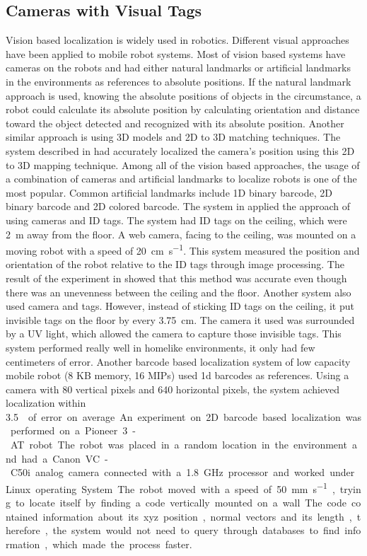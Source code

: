 \documentclass{article}
\begin{document}
  \subsection{Cameras with Visual Tags}
		Vision based localization is widely used in robotics. Different visual approaches have been applied to mobile robot systems. Most of vision based systems have cameras on the robots and had either natural landmarks or artificial landmarks in the environments as references to absolute positions. If the natural landmark approach is used, knowing the absolute positions of objects in the circumstance, a robot could calculate its absolute position by calculating orientation and distance toward the object detected and recognized with its absolute position. Another similar approach is using 3D models and 2D to 3D matching techniques. The system described in \cite{sattler_fast_2011} had accurately localized the camera's position using this 2D to 3D mapping technique. Among all of the vision based approaches, the usage of a combination of cameras and artificial landmarks to localize robots is one of the most popular. Common artificial landmarks include 1D binary barcode, 2D binary barcode and 2D colored barcode. The system in \cite{lin_localization_2004} applied the approach of using cameras and ID tags. The system had ID tags on the ceiling, which were \SI{2}{\meter} away from the floor. A web camera, facing to the ceiling, was mounted on a moving robot with a speed of \SI{20}{\centi\meter\per\second}. This system measured the position and orientation of the robot relative to the ID tags through image processing. The result of the experiment in \cite{lin_localization_2004} showed that this method was accurate even though there was an unevenness between the ceiling and the floor. Another system \cite{huh_mobile_2007} also used camera and tags. However, instead of sticking ID tags on the ceiling, it put invisible tags on the floor by every \SI{3.75}{\centi\meter}. The camera it used was surrounded by a UV light, which allowed the camera to capture those invisible tags. This system performed really well in homelike environments, it only had few centimeters of error. Another barcode based localization system of low capacity mobile robot (8 KB memory, 16 MIPs) \cite{dias_barcode-based_2012} used 1d barcodes as references. Using a camera with 80 vertical pixels and 640 horizontal pixels, the system achieved localization within \SI{3.5}{\meter\per\second\square} of error on average. An experiment on 2D barcode based localization was performed on a Pioneer 3 - AT robot. The robot was placed in a random location in the environment and had a Canon VC-C50i analog camera connected with a \SI{1.8}{\giga\hertz} processor and worked under Linux operating System. The robot moved with a speed of \SI{50}{\milli\meter\per\second}, trying to locate itself by finding a code vertically mounted on a wall. The code contained information about its xyz position, normal vectors and its length, therefore, the system would not need to query through databases to find information, which made the process faster.
\end{document}
